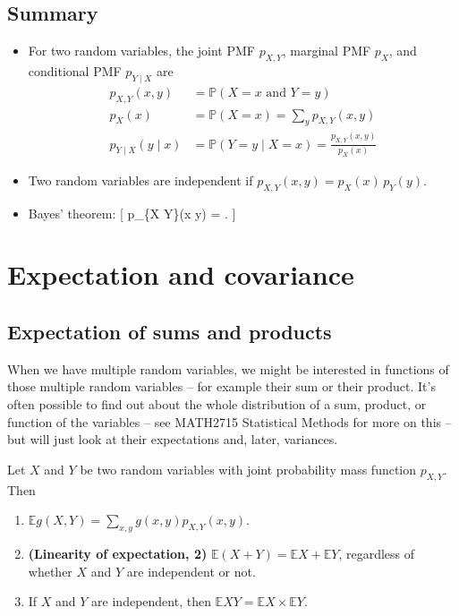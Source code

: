 \documentclass[
  letterpaper,
  DIV=11,
  numbers=noendperiod]{scrreprt}
\providecommand{\tightlist}{%
  \setlength{\itemsep}{0pt}\setlength{\parskip}{0pt}}\usepackage{longtable,booktabs,array}
\theoremstyle{remark}
\begin{document}
\hypertarget{summary-L13}{%
\section*{Summary}\label{summary-L13}}


\begin{itemize}
\tightlist
\item
  For two random variables, the joint PMF \(p_{X,Y}\), marginal PMF
  \(p_X\), and conditional PMF \(p_{Y \mid X}\) are \begin{align*}
  p_{X,Y}(x,y) &= \mathbb P(X =x \text{ and } Y = y) \\
  p_X(x) &= \mathbb P(X = x) = \sum_y p_{X,Y}(x,y) \\
  p_{Y \mid X}(y \mid x) &= \mathbb P(Y = y \mid X = x) = \frac{p_{X,Y}(x,y)}{p_X(x)} 
  \end{align*}
\item
  Two random variables are independent if
  \(p_{X,Y}(x,y) = p_X(x) \, p_Y(y)\).
\item
  Bayes' theorem: {[} p\_\{X \mid Y\}(x \mid y) =
   . {]}
\end{itemize}

\hypertarget{L14-covariance}{%
\chapter{Expectation and covariance}\label{L14-covariance}}

\hypertarget{sum-product}{%
\section{Expectation of sums and products}\label{sum-product}}

When we have multiple random variables, we might be interested in
functions of those multiple random variables -- for example their sum or
their product. It's often possible to find out about the whole
distribution of a sum, product, or function of the variables -- see
MATH2715 Statistical Methods for more on this -- but will just look at
their expectations and, later, variances.

\leavevmode{}%
Let \(X\) and \(Y\) be two random variables with joint probability mass
function \(p_{X,Y}\). Then

\begin{enumerate}
\def\labelenumi{\arabic{enumi}.}
\tightlist
\item
  \(\mathbb Eg(X,Y) = \displaystyle\sum_{x,y} g(x,y) p_{X,Y}(x,y)\).
\item
  \textbf{(Linearity of expectation, 2)}
  \(\mathbb E(X + Y) = \mathbb EX + \mathbb EY\), regardless of whether
  \(X\) and \(Y\) are independent or not.
\item
  If \(X\) and \(Y\) are independent, then
  \(\mathbb EXY = \mathbb EX \times \mathbb EY\).
\end{enumerate}
\end{document}
